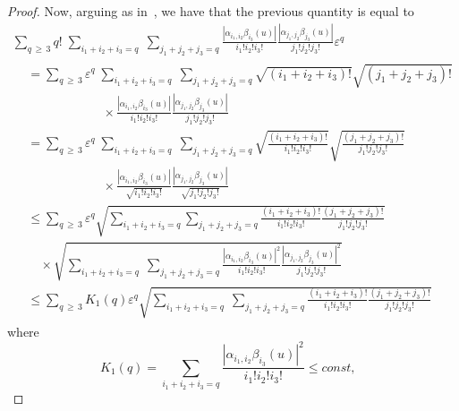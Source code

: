 \documentclass[10pt]{amsart}
\theoremstyle{definition}\newtheorem{defi}[theo]{Definition}\newtheorem{rema}[theo]{Remark}\newtheorem{exam}[theo]{Example}\newtheorem{exem}[theo]{Example}\newtheorem{nota}[theo]{Notation}
\begin{document}
\begin{proof}
\endgroup
Now, arguing as in~\cite[Section~6.2.2]{DNPR:16}, we have that the previous quantity is equal to
\begingroup
\allowdisplaybreaks
\begin{multline*}
\sum_{q\,\geq\,3}q!\;\sum_{i_{1}+i_{2}+i_{3}=q}\;\sum_{j_{1}+j_{2}+j_{3}=q}\frac{\left|\alpha _{i_{1},i_{2}}\beta _{i_{3}}(u)\right|}{i_{1}!i_{2}!i_{3}!}\frac{\left|\alpha _{j_{1},j_{2}}\beta _{j_{3}}(u)\right|}{j_{1}!j_{2}!j_{3}!}\varepsilon^{q} \\
\begin{aligned}
&=\sum_{q\,\geq\,3}\varepsilon^{q}\;\sum_{i_{1}+i_{2}+i_{3}=q}\;\sum_{j_{1}+j_{2}+j_{3}=q}\sqrt{\left(i_{1}+i_{2}+i_{3}\right)!}\sqrt{\left(j_{1}+j_{2}+j_{3}\right)!} \\
&\qquad\qquad\qquad\times \frac{\left|\alpha_{i_{1},i_{2}}\beta_{i_{3}}(u)\right|}{i_{1}!i_{2}!i_{3}!}\frac{\left|\alpha_{j_{1},j_{2}}\beta_{j_{3}}(u)\right|}{j_{1}!j_{2}!j_{3}!} \\
&=\sum_{q\,\geq\,3}\varepsilon^{q}\;\sum_{i_{1}+i_{2}+i_{3}=q}\;\sum_{j_{1}+j_{2}+j_{3}=q}\sqrt{\frac{\left(i_{1}+i_{2}+i_{3}\right)!}{i_{1}!i_{2}!i_{3}!}}\sqrt{\frac{\left(j_{1}+j_{2}+j_{3}\right)!}{j_{1}!j_{2}!j_{3}!}} \\
&\qquad\qquad\qquad\times\frac{\left|\alpha _{i_{1},i_{2}}\beta _{i_{3}}(u)\right|}{\sqrt{i_{1}!i_{2}!i_{3}!}}\frac{\left|\alpha _{j_{1},j_{2}}\beta _{j_{3}}(u)\right|}{
\sqrt{j_{1}!j_{2}!j_{3}!}} \\
&\leq \sum_{q\,\geq\,3}\varepsilon^{q}\sqrt{\sum_{i_{1}+i_{2}+i_{3}=q}
\sum_{j_{1}+j_{2}+j_{3}=q}\frac{\left(i_{1}+i_{2}+i_{3}\right)!}{i_{1}!i_{2}!i_{3}!}
\frac{\left(j_{1}+j_{2}+j_{3}\right)!}{j_{1}!j_{2}!j_{3}!}} \\
&\quad \times \sqrt{\sum_{i_{1}+i_{2}+i_{3}=q}\;\sum_{j_{1}+j_{2}+j_{3}=q}
\frac{\left|\alpha _{i_{1},i_{2}}\beta _{i_{3}}(u)\right|^{2}}{i_{1}!i_{2}!i_{3}!}\frac{\left|\alpha _{j_{1},j_{2}}\beta_{j_{3}}(u)\right|^{2}}{j_{1}!j_{2}!j_{3}!}} \\
&\leq \sum_{q\,\geq\,3}K_{1}(q)\varepsilon ^{q}\sqrt{
\sum_{i_{1}+i_{2}+i_{3}=q}\;\sum_{j_{1}+j_{2}+j_{3}=q}\frac{\left(i_{1}+i_{2}+i_{3}\right)!}{i_{1}!i_{2}!i_{3}!}\frac{\left(j_{1}+j_{2}+j_{3}\right)!}{j_{1}!j_{2}!j_{3}!}}
\end{aligned}
\end{multline*}
\endgroup
where
\begin{equation*}
K_{1}(q)=\sum_{i_{1}+i_{2}+i_{3}=q}\frac{\left|\alpha _{i_{1},i_{2}}\beta _{i_{3}}(u)\right|^{2}}{i_{1}!i_{2}!i_{3}!}\leq const,\text{ }
\end{equation*}

\end{proof}
\end{document}
